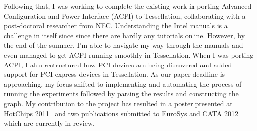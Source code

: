 \documentclass[11pt]{article}
\begin{document}
Following that, I was working to complete the existing work in porting Advanced Configuration and Power Interface (ACPI) to Tessellation, collaborating with a post-doctoral researcher from NEC. Understanding the Intel manuals is a challenge in itself since since there are hardly any tutorials online. However, by the end of the summer, I'm able to navigate my way through the manuals and even managed to get ACPI running smoothly in Tessellation. When I was porting ACPI, I also restructured how PCI devices are being discovered and added support for PCI-express devices in Tessellation. As our paper deadline is approaching, my focus shifted to implementing and automating the process of running the experiments followed by parsing the results and constructing the graph. My contribution to the project has resulted in a poster presented at HotChips 2011~\cite{tess_hotchip} and two publications submitted to EuroSys and CATA 2012~\cite{tess_eurosys, tess_cata} which are currently in-review. \newline


\end{document}
